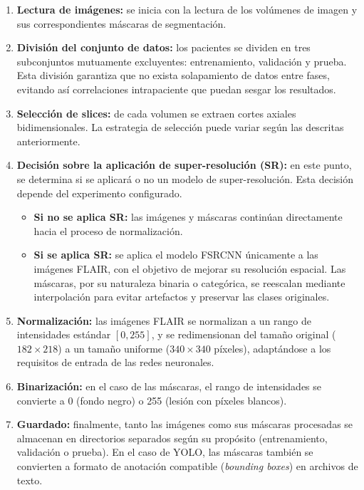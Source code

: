 \documentclass[../main.tex]{subfiles}
\begin{document}
\begin{enumerate}
    \item \textbf{Lectura de imágenes:} se inicia con la lectura de los volúmenes de imagen y sus correspondientes máscaras de segmentación.
    \item \textbf{División del conjunto de datos:} los pacientes se dividen en tres subconjuntos mutuamente excluyentes: entrenamiento, validación y prueba. Esta división garantiza que no exista solapamiento de datos entre fases, evitando así correlaciones intrapaciente que puedan sesgar los resultados.
    \item \textbf{Selección de slices:} de cada volumen se extraen cortes axiales bidimensionales. La estrategia de selección puede variar según las descritas anteriormente.
    \item \textbf{Decisión sobre la aplicación de super-resolución (SR):}     en este punto, se determina si se aplicará o no un modelo de super-resolución. Esta decisión depende del experimento configurado.
        \begin{itemize}
            \item \textbf{Si no se aplica SR:} las imágenes y máscaras continúan directamente hacia el proceso de normalización.
            \item \textbf{Si se aplica SR:} se aplica el modelo FSRCNN únicamente a las imágenes FLAIR, con el objetivo de mejorar su resolución espacial. Las máscaras, por su naturaleza binaria o categórica, se reescalan mediante interpolación para evitar artefactos y preservar las clases originales.
        \end{itemize}
    \item \textbf{Normalización:} las imágenes FLAIR se normalizan a un rango de intensidades estándar $[0,255]$, y se redimensionan del tamaño original ($182 \times 218$) a un tamaño uniforme ($340 \times 340$ píxeles), adaptándose a los requisitos de entrada de las redes neuronales.
    \item \textbf{Binarización:} en el caso de las máscaras, el rango de intensidades se convierte a 0 (fondo negro) o 255 (lesión con píxeles blancos).
    \item \textbf{Guardado:} finalmente, tanto las imágenes como sus máscaras procesadas se almacenan en directorios separados según su propósito (entrenamiento, validación o prueba). En el caso de YOLO, las máscaras también se convierten a formato de anotación compatible (\textit{bounding boxes}) en archivos de texto.
\end{enumerate}
\end{document}
